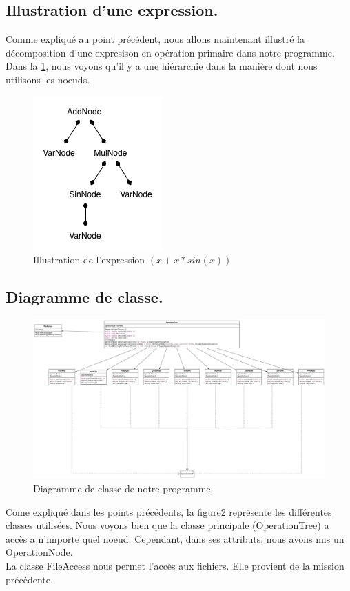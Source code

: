 \documentclass[10pt,a4paper]{article}
\begin{document}
\subsection*{Illustration d'une expression.}
Comme expliqué au point précédent, nous allons maintenant illustré la décomposition d'une expresison en opération primaire dans notre programme. Dans la \ref{fig:ExpressionTree}, nous voyons qu'il y a une hiérarchie dans la manière dont nous utilisons les noeuds. 
\begin{figure}[!h]
    \begin{center}
    \includegraphics[scale=0.5]{ExpressionTree.png}
    \caption{Illustration de l'expression $(x+x*sin(x))$}
    \label{fig:ExpressionTree}
    \end{center}
\end{figure}
\newpage
\subsection*{Diagramme de classe.}
\begin{figure}[!h]
    \begin{center}
    \includegraphics[scale=0.3,angle = 90]{M2_DerivationTree.png}
    \caption{Diagramme de classe de notre programme.}
    \label{fig:ClassDiagram}
    \end{center}
\end{figure}
\newpage
Come expliqué dans les points précédents, la figure\ref{fig:ClassDiagram} représente les différentes classes utilisées. Nous voyons bien que la classe principale (OperationTree) a accès a n'importe quel noeud. Cependant, dans ses attributs, nous avons mis un OperationNode.\\
La classe FileAccess nous permet l'accès aux fichiers. Elle provient de la mission précédente.
\end{document}
